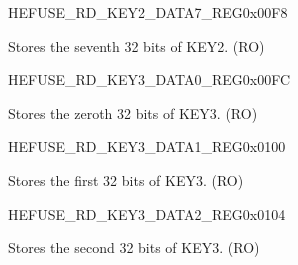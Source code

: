 \begin{register}{H}{EFUSE\_RD\_KEY2\_DATA7\_REG}{0x00F8}\label{regdesc:EFUSERDKEY2DATA7REG}
%
\regnewline%
\begin{regdesc}\begin{reglist}
\label{fielddesc:EFUSEKEY2DATA7}\item [EFUSE\_KEY2\_DATA7] Stores the seventh 32 bits of KEY2. (RO)
\end{reglist}\end{regdesc}
\end{register}


\begin{register}{H}{EFUSE\_RD\_KEY3\_DATA0\_REG}{0x00FC}\label{regdesc:EFUSERDKEY3DATA0REG}
%
\regnewline%
\begin{regdesc}\begin{reglist}
\label{fielddesc:EFUSEKEY3DATA0}\item [EFUSE\_KEY3\_DATA0] Stores the zeroth 32 bits of KEY3. (RO)
\end{reglist}\end{regdesc}
\end{register}


\begin{register}{H}{EFUSE\_RD\_KEY3\_DATA1\_REG}{0x0100}\label{regdesc:EFUSERDKEY3DATA1REG}
%
\regnewline%
\begin{regdesc}\begin{reglist}
\label{fielddesc:EFUSEKEY3DATA1}\item [EFUSE\_KEY3\_DATA1] Stores the first 32 bits of KEY3. (RO)
\end{reglist}\end{regdesc}
\end{register}


\begin{register}{H}{EFUSE\_RD\_KEY3\_DATA2\_REG}{0x0104}\label{regdesc:EFUSERDKEY3DATA2REG}
%
\regnewline%
\begin{regdesc}\begin{reglist}
\label{fielddesc:EFUSEKEY3DATA2}\item [EFUSE\_KEY3\_DATA2] Stores the second 32 bits of KEY3. (RO)
\end{reglist}\end{regdesc}
\end{register}


